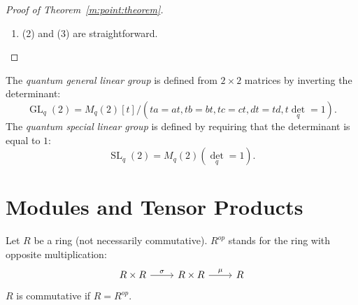\documentclass[8pt]{article}
\theoremstyle{definition}
\theoremstyle{definition}
\theoremstyle{definition}
\theoremstyle{definition}
\theoremstyle{definition}
\theoremstyle{definition}
\theoremstyle{definition}
\theoremstyle{definition}
\theoremstyle{definition}
\theoremstyle{definition}
\theoremstyle{definition}
\theoremstyle{definition}
\theoremstyle{definition}
\theoremstyle{definition}
\theoremstyle{question}
\begin{document}
\begin{proof}[Proof of Theorem~\ref{m:point:theorem}]
\begin{enumerate}
     $\begin{pmatrix} a & c \\ b & d \end{pmatrix} \begin{pmatrix} a' & c' \\ b' & d' \end{pmatrix} \begin{pmatrix} x \\ y \end{pmatrix}$
     and $\begin{pmatrix} a' & c' \\ b' & d' \end{pmatrix} \begin{pmatrix} a & c \\ b & d \end{pmatrix} \begin{pmatrix} x \\ y \end{pmatrix}$
     are $B$-points of $\mathbb{A}^{2|0}_q$. By Theorem~\ref{a:point:theorem}, $\begin{pmatrix} a & c \\ b & d \end{pmatrix} \begin{pmatrix} a' & c' \\ b' & d' \end{pmatrix}$
     is a $B$-point of $\mathbb{A}^{2|0}_q$. To obtain the result for $A$, one should apply $B \to A$
     for which $(a, b, \ldots, d', x,y) \mapsto (a,b, \ldots, d', 0, 0)$.
     \item (2) and (3) are straightforward.
  \end{enumerate}
\end{proof}

The \emph{quantum general linear group} is defined from $2 \times 2$ matrices by inverting the determinant:
\[
\operatorname{GL}_q(2) = M_q(2)[t]/(t a = a t, t b = b t, t c = ct, dt = td, t \operatorname{det}_q = 1). 
\]
The \emph{quantum special linear group} is defined by requiring that the determinant is equal to $1$:
\[
\operatorname{SL}_q(2) = M_q(2)(\operatorname{det}_q = 1).
\]

\section{Modules and Tensor Products}

Let $R$ be a ring (not necessarily commutative). $R^{op}$ stands for the ring with opposite multiplication:
\[
\begin{tikzcd}
  R \times R \ar[r, "\sigma"] & R \times R \ar[r, "\mu"] & R
\end{tikzcd}
\]
$R$ is commutative if $R = R^{op}$.
\end{document}

